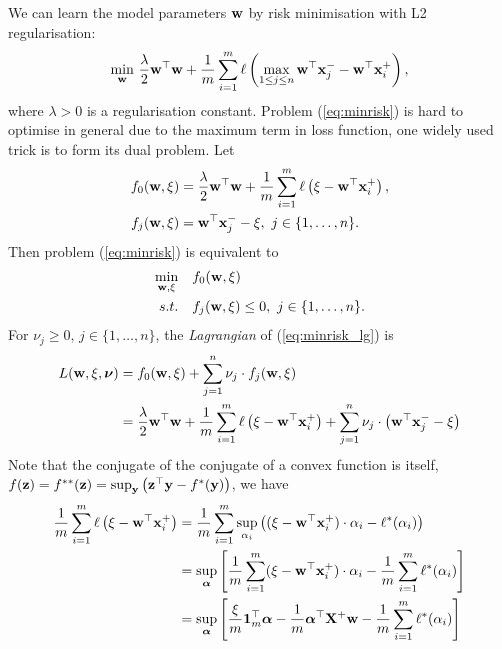 We can learn the model parameters $\mathbf{w}$ by risk minimisation with L2 regularisation:
\begin{equation}
\label{eq:minrisk}
\min_{\mathbf{w}} \, \frac{\lambda}{2} \mathbf{w}^\top \mathbf{w} + \frac{1}{m} \sum_{i=1}^m \ell\left( \max_{1 \le j \le n} \mathbf{w}^\top \mathbf{x}_j^- - \mathbf{w}^\top \mathbf{x}_i^+ \right),
\end{equation}
where $\lambda > 0$ is a regularisation constant.
Problem (\ref{eq:minrisk}) is hard to optimise in general due to the maximum term in loss function, one widely used trick is to form its dual problem.
Let 
\begin{equation*}
\begin{aligned}
f_0 (\mathbf{w}, \xi) &= \frac{\lambda}{2} \mathbf{w}^\top \mathbf{w} + \frac{1}{m} \sum_{i=1}^m \ell\left( \xi - \mathbf{w}^\top \mathbf{x}_i^+ \right), \\
f_j (\mathbf{w}, \xi) &= \mathbf{w}^\top \mathbf{x}_j^- - \xi, \ j \in \{1,\dots,n\}.
\end{aligned}
\end{equation*}
Then problem (\ref{eq:minrisk}) is equivalent to
\begin{equation}
\label{eq:minrisk_lg}
\begin{aligned}
\min_{\mathbf{w}, \xi} \quad & f_0 (\mathbf{w}, \xi) \\
s.t. \quad & f_j (\mathbf{w}, \xi) \le 0, \ j \in \{1,\dots,n\}.
\end{aligned}
\end{equation}
For $\nu_j \ge 0, \, j \in \{1,\dots,n\}$, the \emph{Lagrangian} of (\ref{eq:minrisk_lg}) is
\begin{equation}
\label{eq:minrisk_lg1}
\begin{aligned}
L(\mathbf{w}, \xi, \bm{\nu}) 
&= f_0 (\mathbf{w}, \xi) + \sum_{j=1}^n \nu_j \cdot f_j(\mathbf{w}, \xi) \\
&= \frac{\lambda}{2} \mathbf{w}^\top \mathbf{w} + \frac{1}{m} \sum_{i=1}^m \ell\left( \xi - \mathbf{w}^\top \mathbf{x}_i^+ \right) + \sum_{j=1}^n \nu_j \cdot \left( \mathbf{w}^\top \mathbf{x}_j^- - \xi \right)
\end{aligned}
\end{equation}
Note that the conjugate of the conjugate of a convex function is itself, \ie $f(\mathbf{z}) = f^{**}(\mathbf{z}) = \sup_{\mathbf{y}} \left( \mathbf{z}^\top \mathbf{y} - f^*(\mathbf{y}) \right)$, we have
\begin{equation}
\label{eq:lg_part1}
\begin{aligned}
\frac{1}{m} \sum_{i=1}^m \ell\left( \xi - \mathbf{w}^\top \mathbf{x}_i^+ \right)
&= \frac{1}{m} \sum_{i=1}^m \sup_{\alpha_i} \left( (\xi - \mathbf{w}^\top \mathbf{x}_i^+) \cdot \alpha_i - \ell^*(\alpha_i) \right) \\
&= \sup_{\bm{\alpha}} \left[ \frac{1}{m} \sum_{i=1}^m (\xi - \mathbf{w}^\top \mathbf{x}_i^+) \cdot \alpha_i - \frac{1}{m} \sum_{i=1}^m \ell^*(\alpha_i) \right] \\
&= \sup_{\bm{\alpha}} \left[ \frac{\xi}{m} \mathbf{1}_m^\top \bm{\alpha} - \frac{1}{m} \bm{\alpha}^\top \mathbf{X}^+ \mathbf{w} - \frac{1}{m} \sum_{i=1}^m \ell^*(\alpha_i) \right] \\
\end{aligned}
\end{equation}
